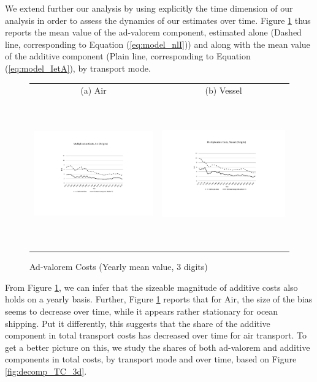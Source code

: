 \documentclass[a4paper,11pt]{article}
\begin{document}
We extend further our analysis by using explicitly the time dimension of our analysis in order to assess the dynamics of our estimates over time. Figure \ref{fig:mult_alone_withadd} thus reports the mean value of the ad-valorem component, estimated alone (Dashed line, corresponding to Equation (\ref{eq:model_nlI})) and along with the mean value of the additive component (Plain line, corresponding to Equation (\ref{eq:model_IetA}), by transport mode.

\begin{figure}[htbp]
\caption{Ad-valorem Costs (Yearly mean value, 3 digits)}
\label{fig:mult_alone_withadd}
\begin{center}
\begin{tabular}{cc}
{\small (a) Air } & {\small (b) Vessel}\\
\includegraphics[width=3in, height=2.5in]{Fig1a_mult_air_3d.pdf}
& \includegraphics[width=3in,height=2.5in]{Fig1b_mult_vessel_3d.pdf} \\
\end{tabular}
\end{center}
\end{figure}

From Figure \ref{fig:mult_alone_withadd}, we can infer that the sizeable magnitude of additive costs also holds on a yearly basis. Further, Figure \ref{fig:mult_alone_withadd} reports that for Air, the size of the bias seems to decrease over time, while it appears rather stationary for ocean shipping. Put it differently, this suggests that the share of the additive component in total transport costs has decreased over time for air transport. To get a better picture on this, we study the shares of both ad-valorem and additive components in total costs, by transport mode and over time, based on Figure \ref{fig:decomp_TC_3d}.
\end{document}
